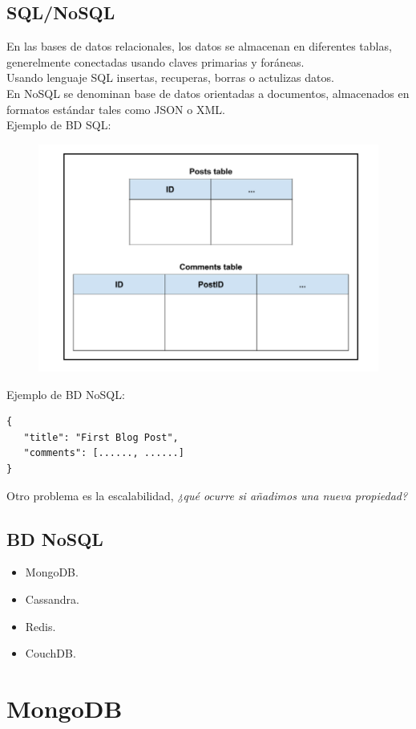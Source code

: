 \documentclass[4paper]{article}
\begin{document}
\subsection{SQL/NoSQL}
En las bases de datos relacionales, los datos se almacenan en diferentes tablas, generelmente conectadas usando claves primarias y foráneas.\\
Usando lenguaje SQL insertas, recuperas, borras o actulizas datos.\\
En NoSQL se denominan base de datos orientadas a documentos, almacenados en formatos estándar tales como JSON o XML.\\
Ejemplo de BD SQL:
\begin{figure}[H]
\includegraphics[scale=0.5]{sql.png}
\end{figure}
Ejemplo de BD NoSQL:
\begin{lstlisting}
{
   "title": "First Blog Post",
   "comments": [......, ......]
}
\end{lstlisting}
Otro problema es la escalabilidad, \emph{¿qué ocurre si añadimos una nueva propiedad?}

\subsection{BD NoSQL}
\begin{itemize}
\item MongoDB.
\item Cassandra.
\item Redis.
\item CouchDB.
\end{itemize}

\section{MongoDB}
\end{document}
